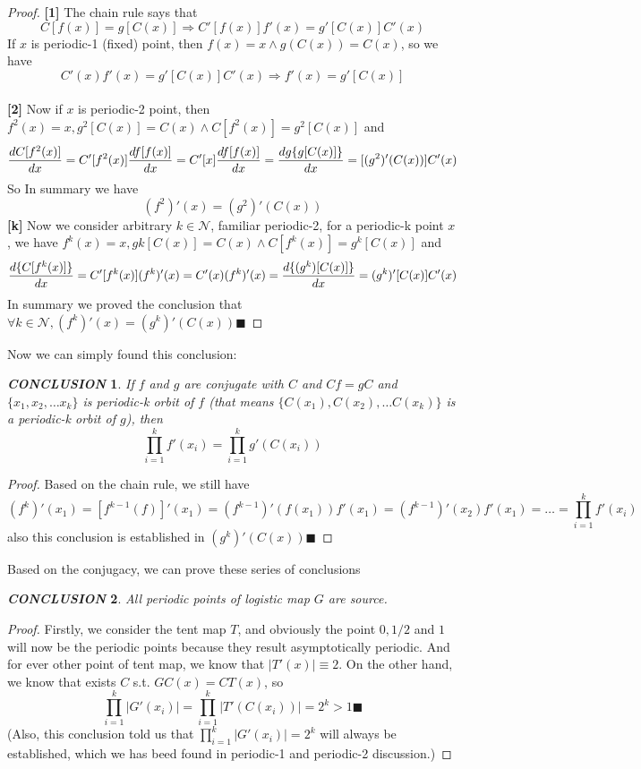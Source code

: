 \documentclass[12pt]{article}
\theoremstyle{plain}
\newtheorem{proof}{\textit{PROOF}}[section]
\newtheorem{conclusion}{\textit{\textbf{CONCLUSION}}}[section]
\begin{document}
{\color{blue}
\begin{proof} \textbf{[1]} The chain rule says that 
$$
C[f(x)] = g[C(x)] \Rightarrow C'[f(x)]f'(x) = g'[C(x)]C'(x)
$$
If $x$ is periodic-1 (fixed) point, then $f(x) = x \land g(C(x)) = C(x)$, so we have
$$
C'(x)f'(x) = g'[C(x)]C'(x) \Rightarrow f'(x) = g'[C(x)]
$$
\\\noindent \textbf{[2]} Now if $x$ is periodic-2 point, then $f^2(x) = x, g^2[C(x)] = C(x) \land C[f^2(x)]=g^2[C(x)]$ and 
$$
{dC[f^2(x)] \over dx} 
= C'[f^2(x)]{df[f(x)] \over dx} 
= C'[x]{df[f(x)] \over dx}
={dg\{g[C(x)]\} \over dx} = [(g^2)'(C(x))]C'(x)
$$
So In summary we have
$$
(f^2)'(x) = (g^2)'(C(x))
$$
\textbf{[k]} Now we consider arbitrary $k \in \mathcal N$, familiar periodic-2, for a periodic-k point $x$, we have $f^{k}(x) = x, g{k}[C(x)] = C(x) \land C[f^{k}(x)]=g^{k}[C(x)]$ and 
$$
{d\{C[f^{k}(x)]\} \over dx} = C'[f^{k}(x)](f^{k})'(x) = C'(x)(f^{k})'(x) = {d\{(g^k)[C(x)]\} \over dx} = (g^k)'[C(x)]C'(x) 
$$
In summary we proved the conclusion that $\forall k \in \mathcal N, (f^k)'(x) = (g^k)'(C(x)) \blacksquare$
\end{proof}
}

Now we can simply found this conclusion:

\begin{conclusion} If $f$ and $g$ are conjugate with $C$ and $Cf = gC$ and $\{x_1, x_2, \ldots x_k\}$ is periodic-k orbit of $f$ (that means $\{C(x_1), C(x_2), \ldots C(x_k)\}$ is a periodic-k orbit of $g$), then 
$$
\prod_{i = 1}^{k}f'(x_i) = \prod_{i = 1}^{k}g'(C(x_i))
$$
\end{conclusion}
{\color{blue}
\begin{proof} Based on the chain rule, we still have
$$
(f^{k})'(x_1) = [f^{k-1} (f)]'(x_1) = (f^{k-1})'(f(x_1)) f'(x_1) = (f^{k-1})'(x_2) f'(x_1) = \ldots = \prod_{i = 1}^{k}f'(x_i)
$$
also this conclusion is established in $(g^k)'(C(x)) \blacksquare$
\end{proof}
}


Based on the conjugacy, we can prove these series of conclusions
\begin{conclusion} All periodic points of logistic map $G$ are source.
\end{conclusion}
{\color{blue}
\begin{proof} Firstly, we consider the tent map $T$, and obviously the point $0, 1/2$ and $1$ will now be the periodic points because they result asymptotically periodic. And for ever other point of tent map, we know that $|T'(x)| \equiv 2$. On the other hand, we know that exists $C$ s.t. $GC(x) = CT(x)$, so 
$$
\prod_{i = 1}^{k}|G'(x_i)| = \prod_{i = 1}^{k}|T'(C(x_i))| = 2^k > 1 \blacksquare
$$
(Also, this conclusion told us that $\prod_{i = 1}^{k}|G'(x_i)| = 2^k$ will always be established, which we has beed found in periodic-1 and periodic-2 discussion.)
\end{proof}
}
\end{document}
